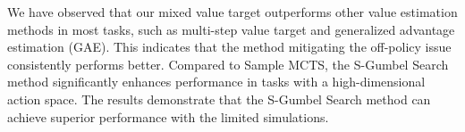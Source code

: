 We have observed that our mixed value target outperforms other value estimation methods in most tasks, such as multi-step value target and generalized advantage estimation (GAE). This indicates that the method mitigating the off-policy issue consistently performs better. Compared to Sample MCTS, the S-Gumbel Search method significantly enhances performance in tasks with a high-dimensional action space. The results demonstrate that the S-Gumbel Search method can achieve superior performance with the limited simulations.


\begin{table}[h]
    \centering
    \caption{Proprio Control 50-100k}
    \label{statedm_abla}
\end{table}

